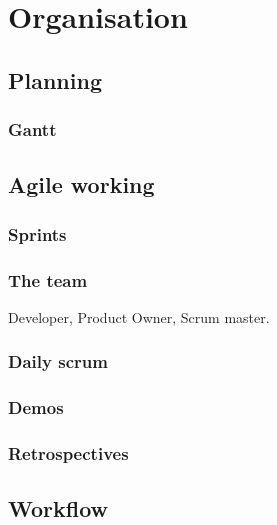 \chapter{Organisation}

\section{Planning}
\subsection{Gantt}
%

\section{Agile working}
\subsection{Sprints}
\subsection{The team}
Developer, Product Owner, Scrum master.
\subsection{Daily scrum}
\subsection{Demos}
\subsection{Retrospectives}

\section{Workflow}
